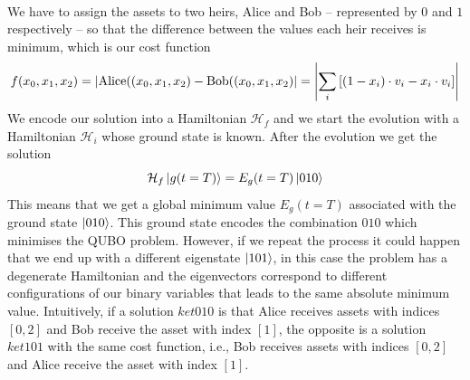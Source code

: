 \\
We have to assign the assets to two heirs, Alice and Bob -- represented by $0$ and $1$ respectively -- so that the difference between the values each heir receives is minimum, which is our cost function
\begin{equation}
    f(x_{0}, x_{1}, x_{2}) = \abs{\text{Alice}((x_{0}, x_{1}, x_{2}) - \text{Bob}((x_{0}, x_{1}, x_{2})} = \abs{\sum_{i}\left[(1-x_{i})\cdot v_{i} - x_{i}\cdot v_{i}\right]}
\end{equation}
We encode our solution into a Hamiltonian $\mathcal{H}_{f}$ and we start the evolution with a Hamiltonian $\mathcal{H}_{i}$ whose ground state is known. After the evolution we get the solution
\begin{equation}
    \mathcal{H}_{f}\ket{g(t=T)} = E_{g}(t=T)\ket{010}
\end{equation}
This means that we get a global minimum value $E_{g}(t=T)$ associated with the ground state $\ket{010}$. This ground state encodes the combination $010$ which minimises the QUBO problem. However, if we repeat the process it could happen that we end up with a different eigenstate $\ket{101}$, in this case the problem has a degenerate Hamiltonian and the eigenvectors correspond to  different configurations of our binary variables that leads to the same absolute minimum value. Intuitively, if a solution $ket{010}$ is that Alice receives assets with indices $[0,2]$ and Bob receive the asset with index $[1]$, the opposite is a solution $ket{101}$ with the same cost function, i.e., Bob receives assets with indices $[0,2]$ and Alice receive the asset with index $[1]$.
